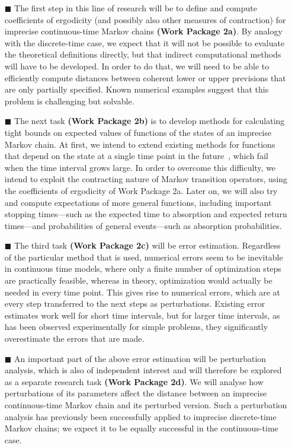 \documentclass[11pt,dvipsnames,usenames,a4paper]{article}
\begin{document}
\vspace{6pt}
\begin{itemize}
\item[\tiny$\blacksquare$]
The first step in this line of research will be to define and compute coefficients of ergodicity (and possibly also other measures of contraction) for imprecise continuous-time Markov chains {\bf(Work Package 2a)}. By analogy with the discrete-time case, we expect that it will not be possible to evaluate the theoretical definitions directly, but that indirect computational methods will have to be developed. In order to do that, we will need to be able to efficiently compute distances between coherent lower or upper previsions that are only partially specified. Known numerical examples suggest that this problem is challenging but solvable. %
\item[\tiny$\blacksquare$]  
The next task {\bf(Work Package 2b)} is to develop methods for calculating tight bounds on expected values of functions of the states of an imprecise Markov chain. At first, we intend to extend existing methods for functions that depend on the state at a single time point in the future~\cite{skulj2015:continuous:bounds}, which fail when the time interval grows large. In order to overcome this difficulty, we intend to exploit the contracting nature of Markov transition operators, using the coefficients of ergodicity of Work Package 2a. Later on, we will also try and compute expectations of more general functions, including important stopping times---such as the expected time to absorption and expected return times---and probabilities of general events---such as absorption probabilities.

\item[\tiny$\blacksquare$] 
The third task {\bf(Work Package 2c)} will be error estimation. 
Regardless of the particular method that is used, numerical errors seem to be inevitable in continuous time models, where only a finite number of optimization steps are practically feasible, whereas in theory, optimization would actually be needed in every time point. 
This gives rise to numerical errors, which are at every step transferred to the next steps as perturbations. 
Existing error estimates work well for short time intervals, but for larger time intervals, as has been observed experimentally for simple problems, they significantly overestimate the errors that are made.

\item[\tiny$\blacksquare$] 
An important part of the above error estimation will be perturbation analysis, which is also of independent interest and will therefore be explored as a separate research task {\bf(Work Package 2d)}. 
We will analyse how perturbations of its parameters affect the distance between an imprecise continuous-time Markov chain and its perturbed version.
Such a perturbation analysis has previously been successfully applied to imprecise discrete-time Markov chains; we expect it to be equally successful in the continuous-time case.\vspace{8pt}
\end{itemize}
\end{document}
